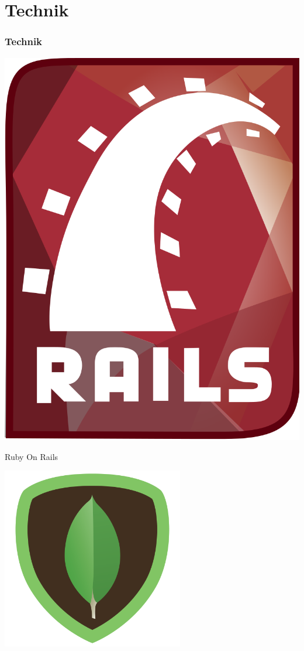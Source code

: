 \documentclass{beamer}
\begin{document}
\section{Technik}
\begin{frame}
  \frametitle{Technik} \pause
  \begin{minipage}{.3\textwidth}
    \includegraphics[height=.3\textheight]{RubyOnRails}
  \end{minipage}%
  \hfill
  \begin{minipage}{.7\textwidth}
    Ruby On Rails \pause \\    
  \end{minipage}
  \begin{minipage}{.3\textwidth}
    \includegraphics[height=.3\textheight]{MongoDB}

\end{minipage}
\end{frame}
\end{document}
